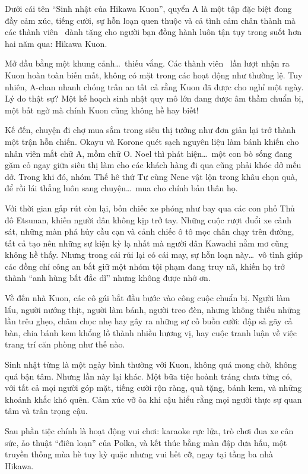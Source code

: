\documentclass[main.tex]{subfiles}
\begin{document}
\color{black}

Dưới cái tên ``Sinh nhật của Hikawa Kuon'', quyển A là một tập đặc biệt đong đầy cảm xúc, tiếng cười, sự hỗn loạn quen thuộc và cả tình cảm chân thành mà các thành viên \hll\ dành tặng cho người bạn đồng hành luôn tận tụy trong suốt hơn hai năm qua: Hikawa Kuon.

Mở đầu bằng một khung cảnh\dots\ thiếu vắng. Các thành viên \hll\ lần lượt nhận ra Kuon hoàn toàn biến mất, không có mặt trong các hoạt động như thường lệ. Tuy nhiên, A-chan nhanh chóng trấn an tất cả rằng Kuon đã được cho nghỉ một ngày. Lý do thật sự? Một kế hoạch sinh nhật quy mô lớn đang được âm thầm chuẩn bị, một bất ngờ mà chính Kuon cũng không hề hay biết!

Kế đến, chuyện đi chợ mua sắm trong siêu thị tưởng như đơn giản lại trở thành một trận hỗn chiến. Okayu và Korone quét sạch nguyên liệu làm bánh khiến cho nhân viên mắt chữ A, mồm chữ O. Noel thì phát hiện\dots\ một con bò sống đang gặm cỏ ngay giữa siêu thị làm cho các khách hàng đi qua cũng phải khóc dở mếu dở. Trong khi đó, nhóm Thế hê thứ Tư cùng Nene vật lộn trong khâu chọn quà, để rồi lái thẳng luôn sang chuyện\dots\ mua cho chính bản thân họ.

Với thời gian gấp rút còn lại, bốn chiếc xe phóng như bay qua các con phố Thủ đô Etsunan, khiến người dân không kịp trở tay. Những cuộc rượt đuổi xe cảnh sát, những màn phá hủy cầu cạn và cảnh chiếc ô tô mọc chân chạy trên đường, tất cả tạo nên những sự kiện kỳ lạ nhất mà người dân Kawachi nằm mơ cũng không hề thấy. Nhưng trong cái rủi lại có cái may, sự hỗn loạn này\dots\ vô tình giúp các đồng chí công an bắt giữ một nhóm tội phạm đang truy nã, khiến họ trở thành ``anh hùng bất đắc dĩ'' nhưng không được nhớ ơn.

Về đến nhà Kuon, các cô gái bắt đầu bước vào công cuộc chuẩn bị. Người làm lẩu, người nướng thịt, người làm bánh, người treo đèn, nhưng không thiếu những lần trêu ghẹo, châm chọc nhẹ hay gây ra những sự cố buồn cười: đập sả gãy cả bàn, chia bánh kem khổng lồ thành nhiều hương vị, hay cuộc tranh luận về việc trang trí căn phòng như thế nào.

Sinh nhật từng là một ngày bình thường với Kuon, không quá mong chờ, không quá bận tâm. Nhưng lần này lại khác. Một bữa tiệc hoành tráng chưa từng có, với tất cả mọi người góp mặt, tiếng cười rộn ràng, quà tặng, bánh kem, và những khoảnh khắc khó quên. Cảm xúc vỡ òa khi cậu hiểu rằng mọi người thực sự quan tâm và trân trọng cậu.

Sau phần tiệc chính là hoạt động vui chơi: karaoke rực lửa, trò chơi đua xe cân sức, ảo thuật ``điên loạn'' của Polka, và kết thúc bằng màn đập dưa hấu, một truyền thống mùa hè tuy kỳ quặc nhưng vui hết cỡ, ngay tại tầng ba nhà Hikawa.
\end{document}
